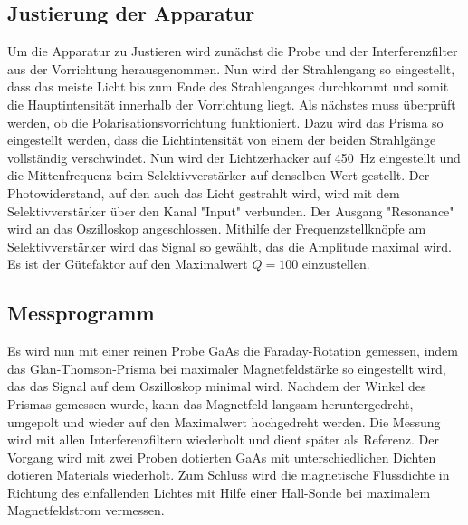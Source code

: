 \subsection{Justierung der Apparatur}
\label{subsec:Justierung}

Um die Apparatur zu Justieren wird zunächst die Probe und der Interferenzfilter aus der Vorrichtung herausgenommen. Nun wird der Strahlengang so eingestellt, dass das
meiste Licht bis zum Ende des Strahlenganges durchkommt und somit die Hauptintensität innerhalb der Vorrichtung liegt.
Als nächstes muss überprüft werden, ob die Polarisationsvorrichtung funktioniert. Dazu wird das Prisma so eingestellt werden, dass die Lichtintensität von einem 
der beiden Strahlgänge vollständig verschwindet.
Nun wird der Lichtzerhacker auf \SI{450}{\hertz} eingestellt und die Mittenfrequenz beim Selektivverstärker auf denselben Wert gestellt.
Der Photowiderstand, auf den auch das Licht gestrahlt wird, wird mit dem Selektivverstärker über den Kanal "Input" verbunden. Der Ausgang "Resonance"
wird an das Oszilloskop angeschlossen. Mithilfe der Frequenzstellknöpfe am Selektivverstärker wird das Signal so gewählt, das die Amplitude maximal wird.
Es ist der Gütefaktor auf den Maximalwert $Q=100$ einzustellen.

\subsection{Messprogramm}
\label{subsec:Messprogramm}

Es wird nun mit einer reinen Probe GaAs die Faraday-Rotation gemessen, indem das Glan-Thomson-Prisma bei maximaler Magnetfeldstärke so eingestellt wird,
das das Signal auf dem Oszilloskop minimal wird. Nachdem der Winkel des Prismas gemessen wurde, kann das Magnetfeld langsam heruntergedreht, umgepolt und wieder auf
den Maximalwert hochgedreht werden. Die Messung wird mit allen Interferenzfiltern wiederholt und dient später als Referenz.
Der Vorgang wird mit zwei Proben dotierten GaAs mit unterschiedlichen Dichten dotieren Materials wiederholt.
Zum Schluss wird die magnetische Flussdichte in Richtung des einfallenden Lichtes mit Hilfe einer Hall-Sonde bei maximalem Magnetfeldstrom vermessen.